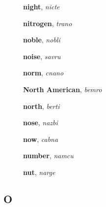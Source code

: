 \documentclass[12pt]{book}
\begin{document}
\begin{description}
\item[ ] \textbf{night}, \textit{nicte}

\item[ ] \textbf{nitrogen}, \textit{trano}

\item[ ] \textbf{noble}, \textit{nobli}

\item[ ] \textbf{noise}, \textit{savru}

\item[ ] \textbf{norm}, \textit{cnano}

\item[ ] \textbf{North American}, \textit{bemro}

\item[ ] \textbf{north}, \textit{berti}

\item[ ] \textbf{nose}, \textit{nazbi}

\item[ ] \textbf{now}, \textit{cabna}

\item[ ] \textbf{number}, \textit{namcu}

\item[ ] \textbf{nut}, \textit{narge}



\end{description}



\subsection{O} %
\end{document}
